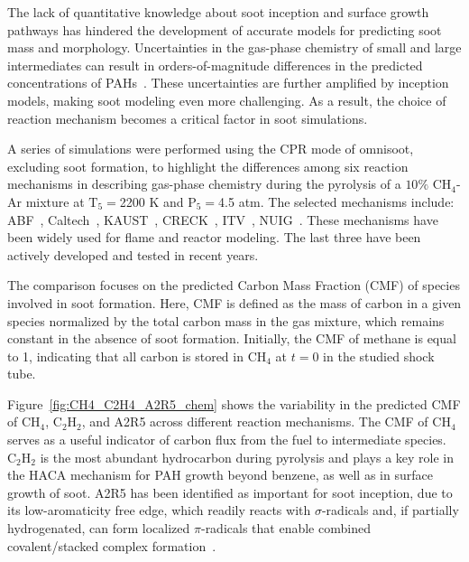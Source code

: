 The lack of quantitative knowledge about soot inception and surface growth pathways has hindered the development of accurate models for predicting soot mass and morphology. Uncertainties in the gas-phase chemistry of small and large intermediates can result in orders-of-magnitude differences in the predicted concentrations of PAHs~\citep{wang2023systematic}. These uncertainties are further amplified by inception models, making soot modeling even more challenging. As a result, the choice of reaction mechanism becomes a critical factor in soot simulations.

A series of simulations were performed using the CPR mode of omnisoot, excluding soot formation, to highlight the differences among six reaction mechanisms in describing gas-phase chemistry during the pyrolysis of a $10\%$ $\mathrm{CH_4}$-Ar mixture at $\mathrm{T_5}=$2200 K and $\mathrm{P_5}=$4.5 atm. The selected mechanisms include: ABF~\citep{appel2000kinetic}, Caltech~\citep{blanquart2009chemical}, KAUST~\citep{wang2013pah}, CRECK~\citep{saggese2015kinetic}, ITV~\citep{hellmuth2024role}, NUIG~\citep{zhu2023wide}. These mechanisms have been widely used for flame and reactor modeling. The last three have been actively developed and tested in recent years. 

The comparison focuses on the predicted Carbon Mass Fraction (CMF) of species involved in soot formation. Here, CMF is defined as the mass of carbon in a given species normalized by the total carbon mass in the gas mixture, which remains constant in the absence of soot formation. Initially, the CMF of methane is equal to 1, indicating that all carbon is stored in $\mathrm{CH_4}$ at $t = 0$ in the studied shock tube. %


Figure~\ref{fig:CH4_C2H4_A2R5_chem} shows the variability in the predicted CMF of $\mathrm{CH_4}$, $\mathrm{C_2H_2}$, and A2R5 across different reaction mechanisms. The CMF of $\mathrm{CH_4}$ serves as a useful indicator of carbon flux from the fuel to intermediate species. $\mathrm{C_2H_2}$ is the most abundant hydrocarbon during pyrolysis and plays a key role in the HACA mechanism for PAH growth beyond benzene, as well as in surface growth of soot. A2R5 has been identified as important for soot inception, due to its low-aromaticity free edge, which readily reacts with $\sigma$-radicals and, if partially hydrogenated, can form localized $\pi$-radicals that enable combined covalent/stacked complex formation~\citep{martin2019reactivity}.


